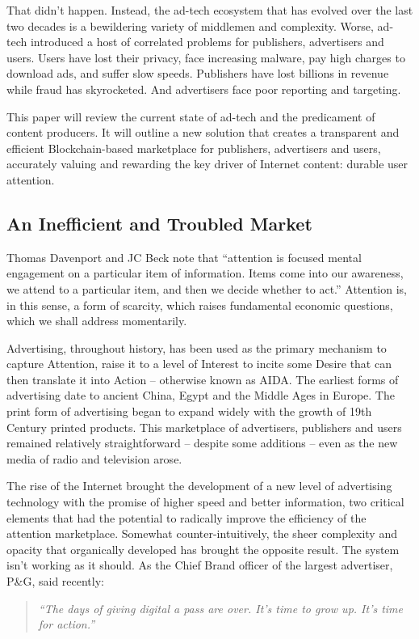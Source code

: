 \documentclass[11pt]{article}
\begin{document}
That didn't happen. Instead, the ad-tech ecosystem that has evolved over the last two decades is a bewildering variety of middlemen and complexity. Worse, ad-tech introduced a host of correlated problems for publishers, advertisers and users. Users have lost their privacy, face increasing malware, pay high charges to download ads, and suffer slow speeds. Publishers have lost billions in revenue while fraud has skyrocketed. And advertisers face poor reporting and targeting.  

This paper will review the current state of ad-tech and the predicament of content producers. It will outline a new solution that creates a transparent and efficient Blockchain-based marketplace for publishers, advertisers and users, accurately valuing and rewarding the key driver of Internet content: durable user attention. 
\subsection{An Inefficient and Troubled Market}
\label{sec-3-1}

Thomas Davenport and JC Beck note that ``attention is focused mental engagement on a particular item of information. Items come into our awareness, we attend to a particular item, and then we decide whether to act.''\cite{2} Attention is, in this sense, a form of scarcity, which raises fundamental economic questions, which we shall address momentarily.
 
Advertising, throughout history, has been used as the primary mechanism to capture Attention, raise it to a level of Interest to incite some Desire that can then translate it into Action -- otherwise known as AIDA.\cite{3} The earliest forms of advertising date to ancient China, Egypt and the Middle Ages in Europe. The print form of advertising began to expand widely with the growth of 19th Century printed products. This marketplace of advertisers, publishers and users remained relatively straightforward -- despite some additions -- even as the new media of radio and television arose. 

The rise of the Internet brought the development of a new level of advertising technology with the promise of higher speed and better information, two critical elements that had the potential to radically improve the efficiency of the attention marketplace. Somewhat counter-intuitively, the sheer complexity and opacity that organically developed has brought the opposite result. The system isn't working as it should. As the Chief Brand officer of the largest advertiser, P\&G, said recently: \begin{quote}\textit{``The days of giving digital a pass are over. It's time to grow up. It's time for action.''}\cite{4}\end{quote}
\end{document}

